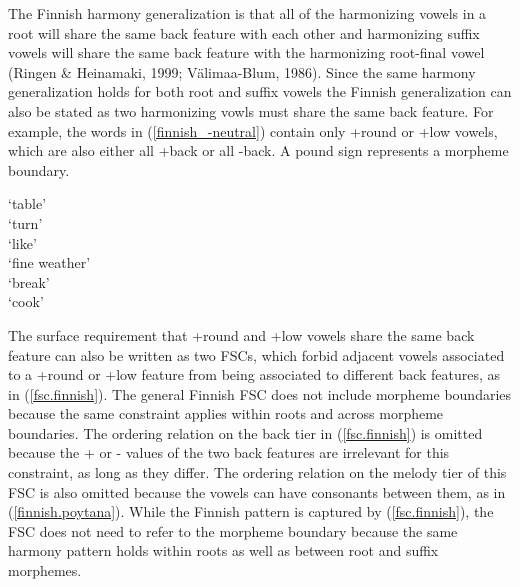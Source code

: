 \documentclass[floatsintext,man]{apa6}
\theoremstyle{definition}
\theoremstyle{definition}
\theoremstyle{definition}
\theoremstyle{remark}
\begin{document}
The Finnish harmony generalization is that all of the harmonizing vowels
in a root will share the same back feature with each other and
harmonizing suffix vowels will share the same back feature with the
harmonizing root-final vowel (Ringen \& Heinamaki, 1999; Välimaa-Blum,
1986). Since the same harmony generalization holds for both root and
suffix vowels the Finnish generalization can also be stated as two
harmonizing vowls must share the same back feature. For example, the
words in (\ref{finnish_-neutral}) contain only +round or +low vowels,
which are also either all +back or all -back. A pound sign represents a
morpheme boundary.

\begin{exe}
\label{finnish_-neutral}
\begin{xlist}
  \ex {} `table' \\
  \ex {} `turn' \\
  \ex {} `like' \\
  \ex {} `fine weather' \\
  \ex {} `break' \\
  \ex {} `cook' \\
  \end{xlist}
\end{exe}

The surface requirement that +round and +low vowels share the same back
feature can also be written as two FSCs, which forbid adjacent vowels
associated to a +round or +low feature from being associated to
different back features, as in (\ref{fsc.finnish}). The general Finnish
FSC does not include morpheme boundaries because the same constraint
applies within roots and across morpheme boundaries. The ordering
relation on the back tier in (\ref{fsc.finnish}) is omitted because the
+ or - values of the two back features are irrelevant for this
constraint, as long as they differ. The ordering relation on the melody
tier of this FSC is also omitted because the vowels can have consonants
between them, as in (\ref{finnish.poytana}). While the Finnish pattern
is captured by (\ref{fsc.finnish}), the FSC does not need to refer to
the morpheme boundary because the same harmony pattern holds within
roots as well as between root and suffix morphemes.
\end{document}
